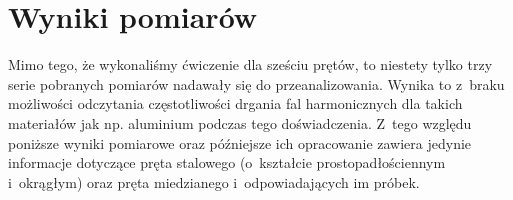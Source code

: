 \documentclass{fizraport}
\begin{document}
\section{Wyniki pomiarów}

Mimo tego, że wykonaliśmy ćwiczenie dla sześciu prętów, to niestety tylko trzy serie pobranych pomiarów nadawały się do przeanalizowania. Wynika to z~braku możliwości odczytania częstotliwości drgania fal harmonicznych dla takich materiałów jak np. aluminium podczas tego doświadczenia.
Z~tego względu poniższe wyniki pomiarowe oraz późniejsze ich opracowanie zawiera jedynie informacje dotyczące pręta stalowego (o~kształcie prostopadłościennym i~okrągłym) oraz pręta miedzianego i~odpowiadających im próbek.

\end{document}
